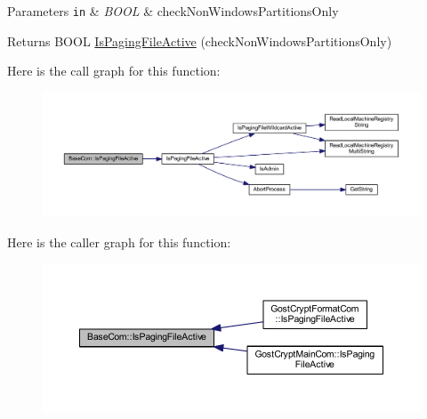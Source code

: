 \begin{DoxyParams}[1]{Parameters}
\mbox{\tt in}  & {\em B\+O\+OL} & check\+Non\+Windows\+Partitions\+Only \\
\hline
\end{DoxyParams}
\begin{DoxyReturn}{Returns}
B\+O\+OL \hyperlink{_dlgcode_8c_a4683f63544f31aee5130df039402b772}{Is\+Paging\+File\+Active} (check\+Non\+Windows\+Partitions\+Only) 
\end{DoxyReturn}
Here is the call graph for this function\+:
\nopagebreak
\begin{figure}[H]
\begin{center}
\leavevmode
\includegraphics[width=350pt]{class_base_com_a41aa000a52c4c44d20b142c8868ef4ea_cgraph}
\end{center}
\end{figure}
Here is the caller graph for this function\+:
\nopagebreak
\begin{figure}[H]
\begin{center}
\leavevmode
\includegraphics[width=350pt]{class_base_com_a41aa000a52c4c44d20b142c8868ef4ea_icgraph}
\end{center}
\end{figure}
\mbox{\label{class_base_com_a86bbb8fc7490090226ed6a27456271e4}} 
